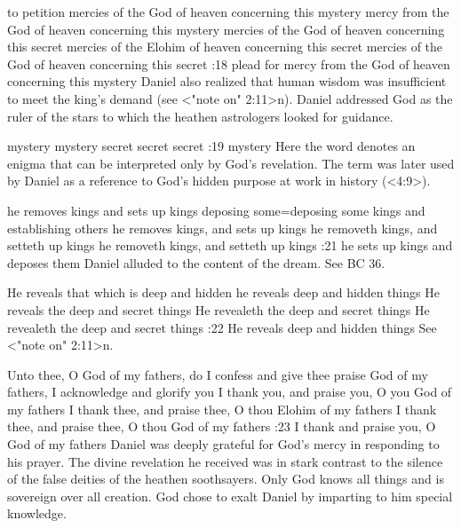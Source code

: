     {to petition mercies of the God of heaven concerning this mystery} %
    {mercy from the God of heaven concerning this mystery} %
    {mercies of the God of heaven concerning this secret} %
    {mercies of the Elohim of heaven concerning this secret} %
    {mercies of  the God of heaven concerning this secret} %
:18 {plead for mercy from the God of heaven concerning this 
mystery} Daniel also realized that human wisdom was insufficient 
to meet the king's demand (see <"note on" 2:11>n). Daniel addressed 
God as the ruler of the stars to which the heathen astrologers 
looked for guidance.

    {mystery} %
    {mystery} %
    {secret} %
    {secret} %
    {secret} %
:19 {mystery} Here the word denotes an enigma that can be interpreted only by God's revelation. The
term was later used by Daniel as a reference to God's hidden purpose at work in history (<4:9>).


    {he removes kings and sets up kings} %
    {deposing some}={deposing some kings and establishing others} %
    {he removes kings, and sets up kings} %
    {he removeth kings, and setteth up kings} %
    {he removeth kings, and setteth up kings} %
:21 {he sets up kings and deposes them} Daniel alluded to  the 
content of the dream. See BC 36.



    {He reveals that which is deep and hidden} %
    {he reveals deep and hidden things} %
    {He reveals the deep and secret things} %
    {He revealeth the deep and secret things} %
    {He revealeth the deep and secret things} %
:22 {He reveals deep and hidden things} See <"note on" 2:11>n.

    {Unto thee, O God of my fathers, do I confess and give thee praise} %
    {God of my fathers, I acknowledge and glorify you} %
    {I thank you, and praise you, O you God of my fathers} %
    {I thank thee, and praise thee, O thou Elohim of my fathers} %
    {I thank thee, and praise thee, O thou God of my fathers} %
:23 {I thank and praise you, O God of my fathers} Daniel was
deeply grateful for God's mercy in responding to his prayer. The 
divine revelation he received was in stark contrast to the silence of
the false deities of the heathen soothsayers. Only God knows all
things and is sovereign over all creation. God chose to exalt Daniel 
by imparting to him special knowledge.

